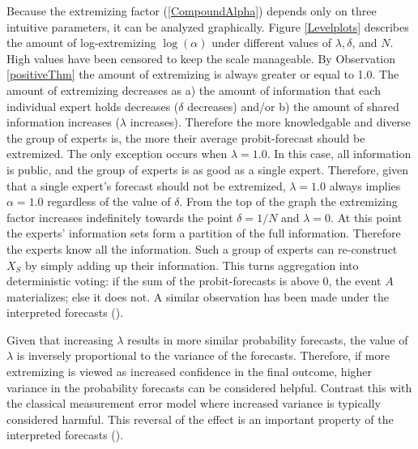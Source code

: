 \documentclass[11pt]{article}
\theoremstyle{definition}
\theoremstyle{definition}
\begin{document}
Because the extremizing factor (\ref{CompoundAlpha}) depends only on three intuitive parameters, it can be analyzed graphically. Figure \ref{Levelplots} describes the amount of log-extremizing $\log(\alpha)$ under different values of $\lambda, \delta$, and $N$. High values have been censored to keep the scale manageable. By Observation \ref{positiveThm} the amount of extremizing is always greater or equal to 1.0. The amount of extremizing decreases as a) the amount of information that each individual expert holds decreases ($\delta$ decreases) and/or b) the amount of shared information increases ($\lambda$ increases). Therefore the more knowledgable and diverse the group of experts is, the more their average probit-forecast should be extremized. The only exception occurs when $\lambda = 1.0$. In this case, all information is public, and the group of experts is as good as a single expert. Therefore, given that a single expert's forecast should not be extremized, $\lambda = 1.0$ always implies $\alpha = 1.0$ regardless of the value of $\delta$. From the top of the graph the extremizing factor increases indefinitely towards the point $\delta = 1/N$ and $\lambda = 0$. At this point the experts' information sets form a partition of the full information. Therefore the experts know all the information. Such a group of experts can re-construct $X_S$ by simply adding up their  information. This turns aggregation into deterministic voting: if the sum of the probit-forecasts is above 0, the event $A$ materializes; else it does not. A similar observation has been made under the interpreted forecasts (\cite{hong2009interpreted}). 

 




Given that increasing $\lambda$ results in more similar probability forecasts, the value of $\lambda$ is inversely proportional to the variance of the forecasts. Therefore, if more extremizing is viewed as increased confidence in the final outcome, higher variance in the probability forecasts can be considered helpful. Contrast this with the classical measurement error model where increased variance is typically considered harmful. This reversal of the effect is an important property of the interpreted forecasts (\cite{hong2009interpreted}). 
\end{document}
